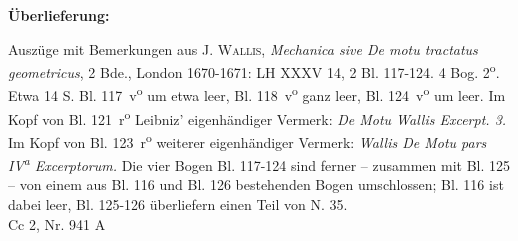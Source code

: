 \begin{ledgroupsized}[r]{120mm}
\footnotesize
\pstart
\noindent\textbf{\"{U}berlieferung:}
\pend
\end{ledgroupsized}
%
\begin{ledgroupsized}[r]{114mm}
\footnotesize
\pstart
\parindent -6mm
Auszüge mit Bemerkungen aus \textsc{J. Wallis}, \textit{Mechanica sive De motu tractatus geometricus}, 2 Bde., London 1670-1671: LH XXXV 14, 2 Bl. 117-124. 4 Bog. 2\textsuperscript{o}. Etwa 14 S. Bl. 117~v\textsuperscript{o} um etwa  leer, Bl. 118~v\textsuperscript{o} ganz leer, Bl. 124~v\textsuperscript{o} um  leer. Im Kopf von Bl. 121~r\textsuperscript{o} Leibniz' eigenhändiger Vermerk: \textit{De Motu Wallis Excerpt. 3.} Im Kopf von Bl. 123~r\textsuperscript{o} weiterer eigenhändiger Vermerk: \textit{Wallis De Motu pars IV\textsuperscript{a} Excerptorum.} Die vier Bogen Bl. 117-124 sind ferner -- zusammen mit Bl. 125 -- von einem aus Bl. 116 und Bl. 126 bestehenden Bogen umschlossen; Bl. 116 ist dabei leer, Bl. 125-126 überliefern einen Teil von N. 35.
\\Cc 2, Nr. 941 A
\pend
\end{ledgroupsized}
\vspace*{5mm}

